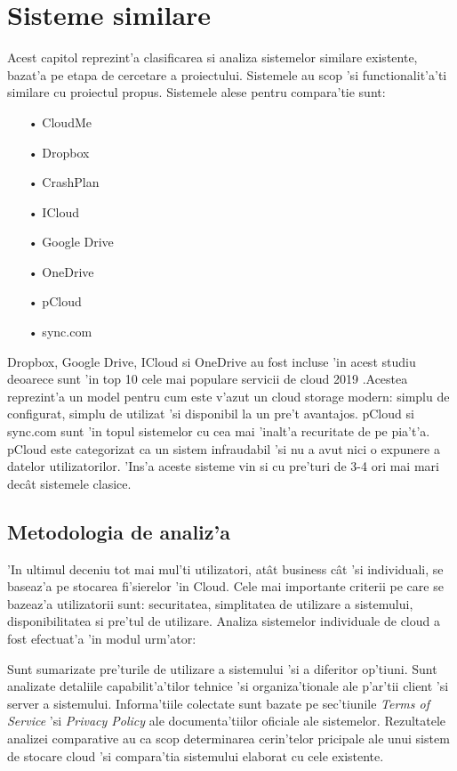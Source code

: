 \documentclass[12pt,a4paper,twoside]{report}
\begin{document}
\section{Sisteme similare}
Acest capitol reprezint'a clasificarea si analiza sistemelor similare existente, bazat'a pe etapa de cercetare a proiectului. Sistemele au scop 'si functionalit'a'ti similare cu proiectul propus. Sistemele alese pentru compara'tie sunt:
\begin{itemize}
\item[•] CloudMe
\item[•] Dropbox
\item[•] CrashPlan
\item[•] ICloud
\item[•] Google Drive
\item[•] OneDrive
\item[•] pCloud
\item[•] sync.com
\end{itemize}
Dropbox, Google Drive, ICloud si OneDrive au fost incluse 'in acest studiu deoarece sunt 'in top 10 cele mai populare servicii de cloud 2019 \cite{topcloud}.Acestea reprezint'a un model pentru cum este v'azut un cloud storage modern: simplu de configurat, simplu de utilizat 'si disponibil la un pre't avantajos.
pCloud si sync.com sunt 'in topul sistemelor cu cea mai 'inalt'a recuritate de pe pia't'a. pCloud este categorizat ca un sistem infraudabil 'si nu a avut nici o expunere a datelor utilizatorilor. 'Ins'a aceste sisteme vin si cu pre'turi de 3-4 ori mai mari decât sistemele clasice.
\subsection{Metodologia de analiz'a}
'In ultimul deceniu tot mai mul'ti utilizatori, atât business cât 'si individuali, se baseaz'a pe stocarea fi'sierelor 'in Cloud.  Cele mai importante criterii pe care se bazeaz'a utilizatorii sunt: securitatea, simplitatea de utilizare a sistemului, disponibilitatea si pre'tul de utilizare. Analiza sistemelor individuale de cloud a fost efectuat'a 'in modul urm'ator:

Sunt sumarizate pre'turile de utilizare a sistemului 'si a diferitor op'tiuni. Sunt analizate detaliile capabilit'a'tilor tehnice 'si organiza'tionale ale p'ar'tii client 'si server a sistemului. Informa'tiile colectate sunt bazate pe sec'tiunile
{\it  Terms of Service } 'si {\it Privacy Policy} ale documenta'tiilor oficiale ale sistemelor.
\cite{cloudstoragecomparison}
Rezultatele analizei comparative au ca scop determinarea cerin'telor pricipale ale unui sistem de stocare cloud 'si compara'tia sistemului elaborat cu cele existente.
\end{document}
